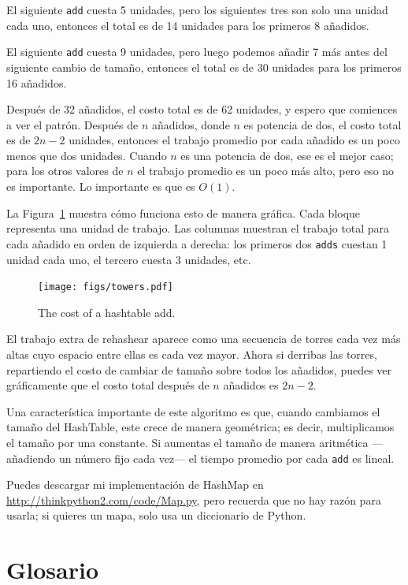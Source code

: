 \documentclass[10pt]{book}
\begin{document}
El siguiente {\tt add} cuesta 5 unidades, pero los siguientes tres
son solo una unidad cada uno, entonces el total es de 14 unidades para los
primeros 8 añadidos.

El siguiente {\tt add} cuesta 9 unidades, pero luego podemos añadir 7 más
antes del siguiente cambio de tamaño, entonces el total es de 30 unidades para los
primeros 16 añadidos.

Después de 32 añadidos, el costo total es de 62 unidades, y espero que comiences
a ver el patrón.  Después de $n$ añadidos, donde $n$ es potencia de dos, el
costo total es de $2n-2$ unidades, entonces el trabajo promedio por cada añadido es
un poco menos que dos unidades.  Cuando $n$ es una potencia de dos, ese es
el mejor caso; para los otros valores de $n$  el trabajo promedio es un poco
más alto, pero eso no es importante.  Lo importante es que
es $O(1)$.

La Figura~\ref{fig.hash} muestra cómo funciona esto de manera gráfica.  Cada
bloque representa una unidad de trabajo.  Las columnas muestran el trabajo
total para cada añadido en orden de izquierda a derecha: los primeros dos
{\tt adds} cuestan 1 unidad cada uno, el tercero cuesta 3 unidades, etc.

\begin{figure}
\centerline{\texttt{[image: figs/towers.pdf]}}
\caption{The cost of a hashtable add.\label{fig.hash}}
\end{figure}

El trabajo extra de rehashear aparece como una secuencia de torres
cada vez más altas cuyo espacio entre ellas es cada vez mayor.  Ahora si derribas
las torres, repartiendo el costo de cambiar de tamaño sobre todos los
añadidos, puedes ver gráficamente que el costo total después de $n$
añadidos es $2n - 2$.

Una característica importante de este algoritmo es que, cuando cambiamos el tamaño del
HashTable, este crece de manera geométrica; es decir, multiplicamos el tamaño por una
constante.  Si aumentas el tamaño de manera
aritmética ---añadiendo un número fijo cada vez--- el tiempo promedio
por cada {\tt add} es lineal.

Puedes descargar mi implementación de HashMap en
\url{http://thinkpython2.com/code/Map.py}, pero recuerda que no hay
razón para usarla; si quieres un mapa, solo usa un diccionario de Python.

\section{Glosario}
\end{document}

